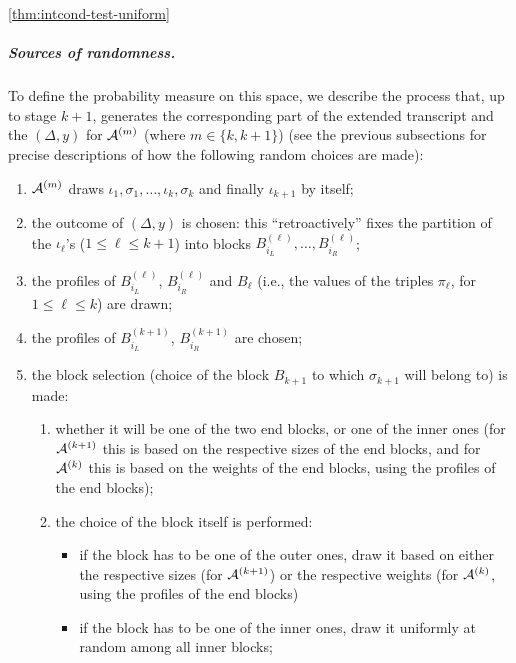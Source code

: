 \begin{proofof}{\cref{thm:intcond-test-uniform}}
\subparagraph{Sources of randomness.}
To define the probability measure on this space, we describe the process that, up to stage $k+1$, generates
the corresponding part of the extended transcript and the $(\Delta,y)$ for $\mathcal{A}^{(m)}$ (where $m\in\{k,k+1\}$)
(see the previous subsections for precise descriptions of how the following random choices are made):
\begin{enumerate}
  \renewcommand{\theenumi}{R\arabic{enumi}}
  \renewcommand{\labelenumi}{(\theenumi)}
  \item\label{item:process:iotak1} $\mathcal{A}^{(m)}$ draws $\iota_1,\sigma_1,\dots, \iota_k,\sigma_k$ and finally $\iota_{k+1}$ by itself;    \item\label{item:process:deltay} the outcome of $(\Delta,y)$ is chosen: this ``retroactively''  fixes the partition of the $\iota_\ell$'s ($1\leq \ell \leq k+1$) into blocks $B^{(\ell)}_{i_L},\dots,B^{(\ell)}_{i_R}$;
  \item\label{item:process:profiles:prev} the profiles of $B^{(\ell)}_{i_L}$, $B^{(\ell)}_{i_R}$ and $B_{\ell}$ (i.e., the values of the triples $\pi_\ell$, for $1\leq \ell \leq k$) are drawn;
  \item\label{item:process:profiles:endblocks} the profiles of $B^{(k+1)}_{i_L}$, $B^{(k+1)}_{i_R}$ are chosen;
  \item\label{item:process:block:selection} the block selection (choice of the block $B_{k+1}$ to which $\sigma_{k+1}$ will belong to) is made:
    \begin{enumerate}
      \item\label{item:process:block:inner:outer:selection} whether it will be one of the two end blocks, or one of the inner ones (for $\mathcal{A}^{(k+1)}$ this is based on the respective sizes of the end blocks, and for $\mathcal{A}^{(k)}$ this is based on the weights of the end blocks, using the profiles of the end blocks);
  \item the choice of the block itself is performed:
        \begin{itemize}
          \item\label{item:process:block:outer:selection} if the block has to be one of the outer ones, draw it based on either the respective sizes (for $\mathcal{A}^{(k+1)}$) or the respective weights (for $\mathcal{A}^{(k)}$, using the profiles of the end blocks)
          \item\label{item:process:block:inner:selection} if the block has to be one of the inner ones, draw it uniformly at random among all inner blocks;
        \end{itemize}

\end{enumerate}
\end{enumerate}
\end{proofof}
